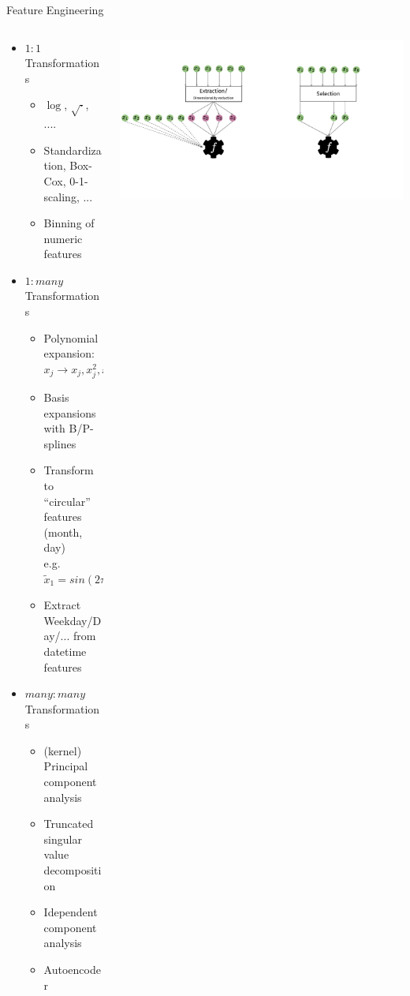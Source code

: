 \begin{frame}{Feature Engineering}
	\begin{columns}
		\begin{column}{0.6\textwidth}
			\begin{itemize}
				\item $1:1$ Transformations
				\begin{itemize}
					\item $\log$, $\sqrt{\cdot}$, ....
					\item Standardization, Box-Cox, 0-1-scaling, ...
					\item Binning of numeric features 
				\end{itemize}
				\item $1:many$ Transformations
				\begin{itemize}
					\item Polynomial expansion: $x_j \longrightarrow x_j, x_j^2, x_j^3, ...$
					\item Basis expansions with B/P-splines
					\item Transform to ``circular'' features (month, day)\\ e.g.\ $\tilde x_1 = sin(2\pi \cdot x_1 /24)$
					\item Extract Weekday/Day/... from datetime features
				\end{itemize}
				\item $many:many$ Transformations 
				\begin{itemize}
					\item (kernel) Principal component analysis
					\item Truncated singular value decomposition
					\item Idependent component analysis
					\item Autoencoder
				\end{itemize}
			\end{itemize}
	\end{column}%
	\begin{column}{0.4\textwidth}
		\begin{center}
			\includegraphics[width= \textwidth, trim=0 100 390 60, clip]{images/feat_extr_vs_selection.pdf}
			\end{center}
	\end{column}
	\end{columns}
\end{frame}

